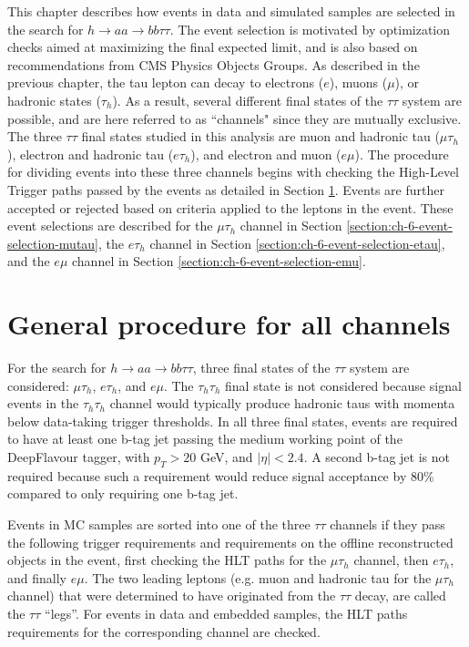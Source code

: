 This chapter describes how events in data and simulated samples are selected in the search for $h \rightarrow aa \rightarrow bb\tau\tau$. The event selection is motivated by optimization checks aimed at maximizing the final expected limit, and is also based on recommendations from CMS Physics Objects Groups. As described in the previous chapter, the tau lepton can decay to electrons ($e$), muons ($\mu$), or hadronic states ($\tau_{h}$). As a result, several different final states of the $\tau\tau$ system are possible, and are here referred to as ``channels" since they are mutually exclusive. The three $\tau\tau$ final states studied in this analysis are muon and hadronic tau ($\mu\tau_{h}$), electron and hadronic tau ($e\tau_{h}$), and electron and muon ($e\mu$). The procedure for dividing events into these three channels begins with checking the High-Level Trigger paths passed by the events as detailed in Section \ref{section:general_event_selection}. Events are further accepted or rejected based on criteria applied to the leptons in the event. These event selections are described for the $\mu\tau_{h}$ channel in Section \ref{section:ch-6-event-selection-mutau}, the $e\tau_{h}$ channel in Section \ref{section:ch-6-event-selection-etau}, and the $e\mu$ channel in Section \ref{section:ch-6-event-selection-emu}.


\section{General procedure for all channels}
\label{section:general_event_selection}
For the search for $h \rightarrow aa \rightarrow bb\tau\tau$, three final states of the $\tau\tau$ system are considered: $\mu\tau_{h}$, $e\tau_{h}$, and $e\mu$. The $\tau_{h}\tau_{h}$ final state is not considered because signal events in the $\tau_{h}\tau_{h}$ channel would typically produce hadronic taus with momenta below data-taking trigger thresholds. In all three final states, events are required to have at least one b-tag jet passing the medium working point of the DeepFlavour tagger, with $p_{T} > 20$ GeV, and $|\eta| < 2.4$. A second b-tag jet is not required because such a requirement would reduce signal acceptance by 80\% compared to only requiring one b-tag jet.

Events in MC samples are sorted into one of the three $\tau\tau$ channels if they pass the following trigger requirements and requirements on the offline reconstructed objects in the event, first checking the HLT paths for the $\mu\tau_{h}$ channel, then $e\tau_{h}$, and finally $e\mu$. The two leading leptons (e.g. muon and hadronic tau for the $\mu\tau_{h}$ channel) that were determined to have originated from the $\tau\tau$ decay, are called the $\tau\tau$ ``legs''. For events in data and embedded samples, the HLT paths requirements for the corresponding channel are checked.

